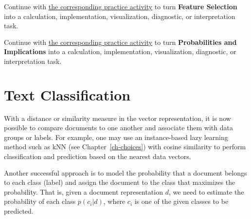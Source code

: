 \documentclass[
  letterpaper,
]{scrbook}
\begin{document}
\begin{tcolorbox}[enhanced jigsaw, arc=.35mm, bottomrule=.15mm, bottomtitle=1mm, breakable, colback=white, colbacktitle=quarto-callout-tip-color!10!white, colframe=quarto-callout-tip-color-frame, coltitle=black, left=2mm, leftrule=.75mm, opacityback=0, opacitybacktitle=0.6, rightrule=.15mm, title=\textcolor{quarto-callout-tip-color}{\faLightbulb}\hspace{0.5em}{Put it into practice}, titlerule=0mm, toprule=.15mm, toptitle=1mm]

Continue with \hyperref[sec-pr-11-feature-selection]{the corresponding
practice activity} to turn \textbf{Feature Selection} into a
calculation, implementation, visualization, diagnostic, or
interpretation task.

\end{tcolorbox}

\begin{tcolorbox}[enhanced jigsaw, arc=.35mm, bottomrule=.15mm, bottomtitle=1mm, breakable, colback=white, colbacktitle=quarto-callout-tip-color!10!white, colframe=quarto-callout-tip-color-frame, coltitle=black, left=2mm, leftrule=.75mm, opacityback=0, opacitybacktitle=0.6, rightrule=.15mm, title=\textcolor{quarto-callout-tip-color}{\faLightbulb}\hspace{0.5em}{Put it into practice}, titlerule=0mm, toprule=.15mm, toptitle=1mm]

Continue with \hyperref[sec-pr-11-probabilities-and-implications]{the
corresponding practice activity} to turn \textbf{Probabilities and
Implications} into a calculation, implementation, visualization,
diagnostic, or interpretation task.

\end{tcolorbox}

\section{Text Classification}\label{text-classification}

With a distance or similarity measure in the vector representation, it
is now possible to compare documents to one another and associate them
with data groups or labels. For example, one may use an instance-based
lazy learning method such as kNN (see
Chapter~\hyperref[ch-choices]{{[}ch-choices{]}}) with cosine similarity
to perform classification and prediction based on the nearest data
vectors.

Another successful approach is to model the probability that a document
belongs to each class (label) and assign the document to the class that
maximizes the probability. That is, given a document representation
\(d\), we need to estimate the probability of each class \(p(c_i|d)\),
where \(c_i\) is one of the given classes to be predicted.
\end{document}
